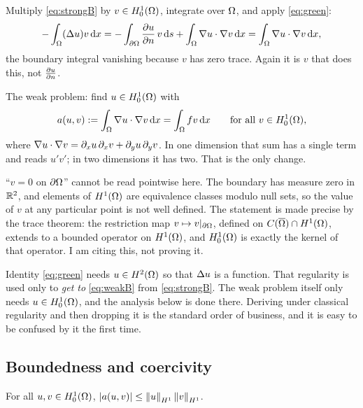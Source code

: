 \documentclass[11pt,a4paper]{article}
\begin{document}
Multiply \eqref{eq:strongB} by $v \in H^{1}_{0}(\Omega)$, integrate over $\Omega$, and apply
\eqref{eq:green}:
\[
  -\int_\Omega (\Delta u)v \,\mathrm{d}x
  = -\int_{\partial\Omega} \frac{\partial u}{\partial n}\,v \,\mathrm{d}s + \int_\Omega \nabla u \cdot \nabla v \,\mathrm{d}x
  = \int_\Omega \nabla u \cdot \nabla v \,\mathrm{d}x ,
\]
the boundary integral vanishing because $v$ has zero trace. Again it is $v$ that
does this, not $\frac{\partial u}{\partial n}$.

The weak problem: find $u \in H^{1}_{0}(\Omega)$ with
\begin{equation}\label{eq:weakB}
  a(u,v) := \int_\Omega \nabla u \cdot \nabla v \,\mathrm{d}x
  = \int_\Omega fv \,\mathrm{d}x
  \qquad \text{for all } v \in H^{1}_{0}(\Omega) ,
\end{equation}
where $\nabla u \cdot \nabla v
= \partial_x u\,\partial_x v + \partial_y u\,\partial_y v$. In one dimension that
sum has a single term and reads $u'v'$; in two dimensions it has two. That is the
only change.

\begin{remark}\label{rem:trace}
``$v=0$ on $\partial\Omega$'' cannot be read pointwise here. The boundary has measure zero
in $\mathbb{R}^{2}$, and elements of $H^{1}(\Omega)$ are equivalence classes modulo null sets, so
the value of $v$ at any particular point is not well defined. The statement is
made precise by the trace theorem: the restriction map
$v \mapsto v\vert_{\partial\Omega}$, defined on $C(\overline{\Omega}) \cap H^{1}(\Omega)$, extends to a
bounded operator on $H^{1}(\Omega)$, and $H^{1}_{0}(\Omega)$ is exactly the kernel of that
operator. I am citing this, not proving it.
\end{remark}

\begin{remark}
Identity \eqref{eq:green} needs $u \in H^{2}(\Omega)$ so that $\Delta u$ is a function. That
regularity is used only to \emph{get to} \eqref{eq:weakB} from
\eqref{eq:strongB}. The weak problem itself only needs $u \in H^{1}_{0}(\Omega)$, and the
analysis below is done there. Deriving under classical regularity and then
dropping it is the standard order of business, and it is easy to be confused by
it the first time.
\end{remark}

\subsection{Boundedness and coercivity}

\begin{proposition}\label{prop:boundB}
For all $u,v \in H^{1}_{0}(\Omega)$, $\left\lvert a(u,v) \right\rvert \le \left\lVert u \right\rVert_{H^{1}}\left\lVert v \right\rVert_{H^{1}}$.
\end{proposition}
\end{document}
